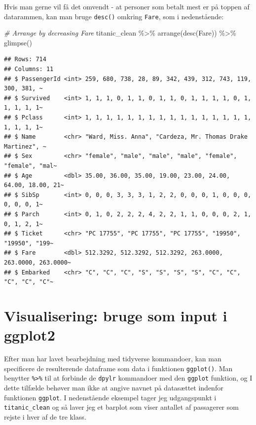 \documentclass[
]{book}
\newenvironment{Shaded}{\begin{snugshade}}{\end{snugshade}}
\newcommand{\CommentTok}[1]{\textcolor[rgb]{0.56,0.35,0.01}{\textit{#1}}}
\newcommand{\FunctionTok}[1]{\textcolor[rgb]{0.00,0.00,0.00}{#1}}
\newcommand{\NormalTok}[1]{#1}
\newcommand{\SpecialCharTok}[1]{\textcolor[rgb]{0.00,0.00,0.00}{#1}}
\begin{document}
Hvis man gerne vil få det omvendt - at personer som betalt mest er på toppen af datarammen, kan man bruge \texttt{desc()} omkring \texttt{Fare}, som i nedenstående:

\begin{Shaded}
\begin{Highlighting}[]
\CommentTok{\# Arrange by decreasing Fare}
\NormalTok{titanic\_clean }\SpecialCharTok{\%\textgreater{}\%}
  \FunctionTok{arrange}\NormalTok{(}\FunctionTok{desc}\NormalTok{(Fare)) }\SpecialCharTok{\%\textgreater{}\%}
  \FunctionTok{glimpse}\NormalTok{()}
\end{Highlighting}
\end{Shaded}

\begin{verbatim}
## Rows: 714
## Columns: 11
## $ PassengerId <int> 259, 680, 738, 28, 89, 342, 439, 312, 743, 119, 300, 381, ~
## $ Survived    <int> 1, 1, 1, 0, 1, 1, 0, 1, 1, 0, 1, 1, 1, 1, 0, 1, 1, 1, 1, 1~
## $ Pclass      <int> 1, 1, 1, 1, 1, 1, 1, 1, 1, 1, 1, 1, 1, 1, 1, 1, 1, 1, 1, 1~
## $ Name        <chr> "Ward, Miss. Anna", "Cardeza, Mr. Thomas Drake Martinez", ~
## $ Sex         <chr> "female", "male", "male", "male", "female", "female", "mal~
## $ Age         <dbl> 35.00, 36.00, 35.00, 19.00, 23.00, 24.00, 64.00, 18.00, 21~
## $ SibSp       <int> 0, 0, 0, 3, 3, 3, 1, 2, 2, 0, 0, 0, 1, 0, 0, 0, 0, 0, 0, 1~
## $ Parch       <int> 0, 1, 0, 2, 2, 2, 4, 2, 2, 1, 1, 0, 0, 0, 2, 1, 0, 1, 2, 1~
## $ Ticket      <chr> "PC 17755", "PC 17755", "PC 17755", "19950", "19950", "199~
## $ Fare        <dbl> 512.3292, 512.3292, 512.3292, 263.0000, 263.0000, 263.0000~
## $ Embarked    <chr> "C", "C", "C", "S", "S", "S", "S", "C", "C", "C", "C", "C"~
\end{verbatim}

\hypertarget{visualisering-bruge-som-input-i-ggplot2}{%
\section{Visualisering: bruge som input i ggplot2}\label{visualisering-bruge-som-input-i-ggplot2}}

Efter man har lavet bearbejdning med tidyverse kommandoer, kan man specificere de resulterende dataframe som data i funktionen \texttt{ggplot()}. Man benytter \texttt{\%\textgreater{}\%} til at forbinde de \texttt{dpylr} kommandoer med den \texttt{ggplot} funktion, og I dette tilfælde behøver man ikke at angive navnet på datasættet indenfor funktionen \texttt{ggplot}. I nedenstående eksempel tager jeg udgangspunkt i \texttt{titanic\_clean} og så laver jeg et barplot som viser antallet af passagerer som rejste i hver af de tre klass.
\end{document}
